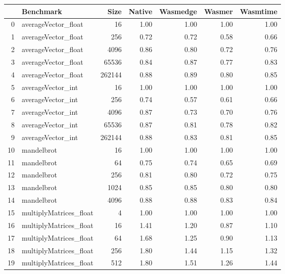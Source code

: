 \begin{tabular}{rlrrrrr}
\toprule
    & Benchmark              &   Size &   Native &   Wasmedge &   Wasmer &   Wasmtime \\
\midrule
  0 & averageVector\_float    &     16 &   1.00 &     1.00 &   1.00 &     1.00 \\
  1 & averageVector\_float    &    256 &   0.72 &     0.72 &   0.58 &     0.66 \\
  2 & averageVector\_float    &   4096 &   0.86 &     0.80 &   0.72 &     0.76 \\
  3 & averageVector\_float    &  65536 &   0.84 &     0.87 &   0.77 &     0.83 \\
  4 & averageVector\_float    & 262144 &   0.88 &     0.89 &   0.80 &     0.85 \\
  5 & averageVector\_int      &     16 &   1.00 &     1.00 &   1.00 &     1.00 \\
  6 & averageVector\_int      &    256 &   0.74 &     0.57 &   0.61 &     0.66 \\
  7 & averageVector\_int      &   4096 &   0.87 &     0.73 &   0.70 &     0.76 \\
  8 & averageVector\_int      &  65536 &   0.87 &     0.81 &   0.78 &     0.82 \\
  9 & averageVector\_int      & 262144 &   0.88 &     0.83 &   0.81 &     0.85 \\
 10 & mandelbrot             &     16 &   1.00 &     1.00 &   1.00 &     1.00 \\
 11 & mandelbrot             &     64 &   0.75 &     0.74 &   0.65 &     0.69 \\
 12 & mandelbrot             &    256 &   0.81 &     0.80 &   0.72 &     0.75 \\
 13 & mandelbrot             &   1024 &   0.85 &     0.85 &   0.80 &     0.80 \\
 14 & mandelbrot             &   4096 &   0.88 &     0.88 &   0.83 &     0.84 \\
 15 & multiplyMatrices\_float &      4 &   1.00 &     1.00 &   1.00 &     1.00 \\
 16 & multiplyMatrices\_float &     16 &   1.41 &     1.20 &   0.87 &     1.10 \\
 17 & multiplyMatrices\_float &     64 &   1.68 &     1.25 &   0.90 &     1.13 \\
 18 & multiplyMatrices\_float &    256 &   1.80 &     1.44 &   1.15 &     1.32 \\
 19 & multiplyMatrices\_float &    512 &   1.80 &     1.51 &   1.26 &     1.44 \\

\end{tabular}

